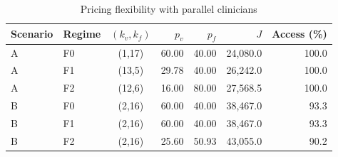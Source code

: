 \begin{table}[ht]
\centering\footnotesize
\caption{Pricing flexibility with parallel clinicians}\label{tab:staff-pricing}
\begin{tabular}{@{}llcrrrr@{}}\toprule
Scenario & Regime & $(k_v,k_f)$ & $p_v$ & $p_f$ & $J$ & Access (\%)\\\midrule
A & F0 & (1,17) & 60.00 & 40.00 & 24,080.0 & 100.0\\
A & F1 & (13,5) & 29.78 & 40.00 & 26,242.0 & 100.0\\
A & F2 & (12,6) & 16.00 & 80.00 & 27,568.5 & 100.0\\
B & F0 & (2,16) & 60.00 & 40.00 & 38,467.0 & 93.3\\
B & F1 & (2,16) & 60.00 & 40.00 & 38,467.0 & 93.3\\
B & F2 & (2,16) & 25.60 & 50.93 & 43,055.0 & 90.2\\
\bottomrule\end{tabular}
\end{table}
